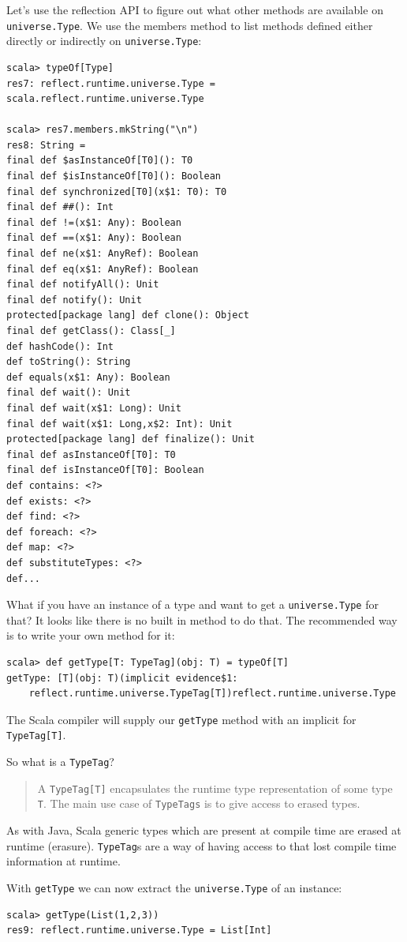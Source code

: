 \documentclass[11pt,a4paper,answers]{exam}
\begin{document}
Let’s use the reflection API to figure out what other methods are available on \verb!universe.Type!. 
We use the members method to list methods defined either directly or indirectly on \verb!universe.Type!:
\begin{Verbatim}
scala> typeOf[Type]
res7: reflect.runtime.universe.Type = scala.reflect.runtime.universe.Type

scala> res7.members.mkString("\n")
res8: String =
final def $asInstanceOf[T0](): T0
final def $isInstanceOf[T0](): Boolean
final def synchronized[T0](x$1: T0): T0
final def ##(): Int
final def !=(x$1: Any): Boolean
final def ==(x$1: Any): Boolean
final def ne(x$1: AnyRef): Boolean
final def eq(x$1: AnyRef): Boolean
final def notifyAll(): Unit
final def notify(): Unit
protected[package lang] def clone(): Object
final def getClass(): Class[_]
def hashCode(): Int
def toString(): String
def equals(x$1: Any): Boolean
final def wait(): Unit
final def wait(x$1: Long): Unit
final def wait(x$1: Long,x$2: Int): Unit
protected[package lang] def finalize(): Unit
final def asInstanceOf[T0]: T0
final def isInstanceOf[T0]: Boolean
def contains: <?>
def exists: <?>
def find: <?>
def foreach: <?>
def map: <?>
def substituteTypes: <?>
def...	
\end{Verbatim}
What if you have an instance of a type and want to get a \verb!universe.Type! for that? 
It looks like there is no built in method to do that. The recommended way is to write your own method for it:
\begin{Verbatim}
scala> def getType[T: TypeTag](obj: T) = typeOf[T]
getType: [T](obj: T)(implicit evidence$1: 
	reflect.runtime.universe.TypeTag[T])reflect.runtime.universe.Type	
\end{Verbatim}
The Scala compiler will supply our \verb!getType! method with an implicit for \verb!TypeTag[T]!.

So what is a \verb!TypeTag!?

\begin{quotation}
A \verb!TypeTag[T]! encapsulates the runtime type representation of some type \verb!T!. 
The main use case of \verb!TypeTags! is to give access to erased types.	
\end{quotation}

As with Java, Scala generic types which are present at compile time are erased at runtime (erasure). 
\verb!TypeTag!s are a way of having access to that lost compile time information at runtime.

With \verb!getType! we can now extract the \verb!universe.Type! of an instance:
\begin{Verbatim}
scala> getType(List(1,2,3))
res9: reflect.runtime.universe.Type = List[Int]	
\end{Verbatim}
\end{document}
